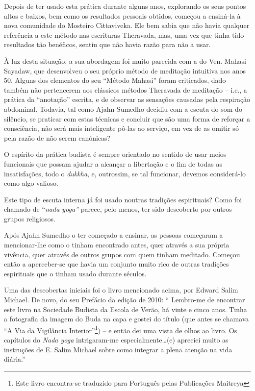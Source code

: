 Depois de ter usado esta prática durante alguns anos, explorando os seus
pontos altos e baixos, bem como os resultados pessoais obtidos, começou
a ensiná-la à nova comunidade do Mosteiro Cittaviveka. Ele bem sabia que
não havia qualquer referência a este método nas escrituras Theravada,
mas, uma vez que tinha tido resultados tão benéficos, sentiu que não
havia razão para não a usar.

À luz desta situação, a sua abordagem foi muito parecida com a do Ven.
Mahasi Sayadaw, que desenvolveu o seu próprio método de meditação
intuitiva nos anos 50. Alguns dos elementos do seu ``Método Mahasi''
foram criticados, dado também não pertencerem aos clássicos métodos
Theravada de meditação -- i.e., a prática da ``anotação'' escrita, e de
observar as sensações causadas pela respiração abdominal. Todavia, tal
como Ajahn Sumedho decidiu com a escuta do som do silêncio, se praticar
com estas técnicas e concluir que são uma forma de reforçar a
consciência, não será mais inteligente pô-las ao serviço, em vez de as
omitir só pela razão de não serem canónicas?

O espírito da prática budista é sempre orientado no sentido de usar
meios funcionais que possam ajudar a alcançar a libertação e o fim de
todas as insatisfações, todo o \emph{dukkha}, e, outrossim, se tal
funcionar, devemos considerá-lo como algo valioso.

 Este tipo de escuta interna já foi usado noutras tradições
espirituais? Como foi chamado de ``\emph{nada yoga''} parece, pelo
menos, ter sido descoberto por outros grupos religiosos.

 Após Ajahn Sumedho o ter começado a ensinar, as pessoas começaram a
mencionar-lhe como o tinham encontrado antes, quer através a sua própria
vivência, quer através de outros grupos com quem tinham meditado.
Começou então a aperceber-se que havia um conjunto muito rico de outras
tradições espirituais que o tinham usado durante séculos.

Uma das descobertas iniciais foi o livro mencionado acima, por Edward Salim
Michael. De novo, do seu Prefácio da edição de 2010: `` Lembro-me de encontrar
este livro na Sociedade Budista da Escola de Verão, há vinte e cinco anos. Tinha
a fotografia da imagem do Buda na capa e gostei do título (que antes se chamava
``A Via da Vigilância Interior''\footnote{Este livro encontra-se traduzido para
  Português pelas Publicações Maitreya}) -- e então dei uma vista de olhos ao
livro. Os capítulos do \emph{Nada yoga} intrigaram-me especialmente\ldots{}(e)
apreciei muito as instruções de E. Salim Michael sobre como integrar a plena
atenção na vida diária.''

